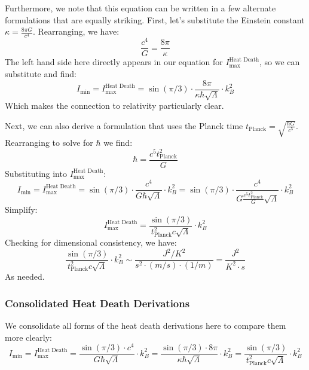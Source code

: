 \documentclass[12pt]{article}
\begin{document}
Furthermore, we note that this equation can be written in a few alternate formulations that are equally striking. First, let's substitute the Einstein constant $\kappa = \frac{8 \pi G}{c^4}$. Rearranging, we have:
\begin{equation}
    \frac{c^4}{G} = \frac{8 \pi}{\kappa}
\end{equation}
The left hand side here directly appears in our equation for $I_\text{max}^{\text{Heat Death}}$, so we can substitute and find:
\begin{equation}
    \boxed{I_\text{min} = I_\text{max}^{\text{Heat Death}} = \sin(\pi / 3) \cdot \frac{8\pi}{\kappa \hbar \sqrt{\Lambda}} \cdot k_B^2}
\end{equation}
Which makes the connection to relativity particularly clear.

Next, we can also derive a formulation that uses the Planck time $t_\text{Planck} = \sqrt{\frac{\hbar G}{c^5}}$. Rearranging to solve for $\hbar$ we find:
\begin{equation}
    \hbar = \frac{c^5 t_\text{Planck}^2}{G}
\end{equation}
Substituting into $I_\text{max}^{\text{Heat Death}}$:
\begin{equation}
    I_\text{min} = I_\text{max}^{\text{Heat Death}} = \sin(\pi / 3) \cdot \frac{c^4}{G \hbar \sqrt{\Lambda}} \cdot k_B^2 = \sin(\pi / 3) \cdot \frac{c^4}{G \frac{c^5 t_\text{Planck}^2}{G} \sqrt{\Lambda}} \cdot k_B^2
\end{equation}
Simplify:
\begin{equation}
    \boxed{I_\text{max}^{\text{Heat Death}} = \frac{\sin(\pi / 3)}{t_\text{Planck}^2 c \sqrt{\Lambda}} \cdot k_B^2}
\end{equation}
Checking for dimensional consistency, we have:
\begin{equation}
    \frac{\sin(\pi / 3)}{t_\text{Planck}^2 c \sqrt{\Lambda}} \cdot k_B^2 \sim \frac{J^2/K^2}{s^2 \cdot (m/s) \cdot (1/m)} = \frac{J^2}{K^2 \cdot s}
\end{equation}
As needed.

\subsubsection{Consolidated Heat Death Derivations}
We consolidate all forms of the heat death derivations here to compare them more clearly:
\begin{equation}
    \boxed{I_\text{min} = I_\text{max}^{\text{Heat Death}} = \frac{\sin(\pi / 3) \cdot c^4}{G \hbar \sqrt{\Lambda}} \cdot k_B^2 = \frac{\sin(\pi / 3) \cdot 8\pi}{\kappa \hbar \sqrt{\Lambda}} \cdot k_B^2 = \frac{\sin(\pi / 3)}{t_\text{Planck}^2 c \sqrt{\Lambda}} \cdot k_B^2}
\end{equation}
\end{document}
